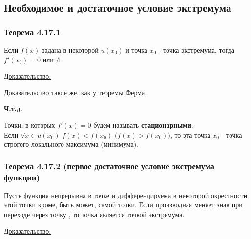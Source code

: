 \documentclass[12pt]{article}
\begin{document}
    \subsection{Необходимое и достаточное условие экстремума}
    \subsubsection*{Теорема 4.17.1}\label{th:4.17.1}
    Если $f(x)$ задана в некоторой $u(x_0)$ и точка $x_0$ - точка экстремума, тогда $f'(x_0) = 0$ или $\nexists$\par\noindent
    \underline{Доказательство:}
    \begin{adjustwidth}{1.5em}{1.5em}
        Доказательство такое же, как у \hyperref[th:4.12.1]{теоремы Ферма}.
        \begin{center}
            \textbf{Ч.т.д.}
        \end{center}
    \end{adjustwidth}
    Точки, в которых $f'(x) = 0$ будем называть \textbf{стационарными}.\\
    Если $\forall x \in u(x_0)$ $f(x) < f(x_0)$ ($f(x) > f(x_0)$), то эта точка $x_0$ - точка строгого локального максимума (минимума).
    \subsubsection*{Теорема 4.17.2 (первое достаточное условие экстремума функции)}\label{th:4.17.2}
    Пусть функция непрерывна в точке и дифференцируема в некоторой окрестности этой точки кроме, быть может, самой точки. Если производная меняет знак при переходе через точку , то точка является точкой экстремума.
    \par\noindent
    \underline{Доказательство:}
    \begin{adjustwidth}{1.5em}{1.5em}
    \end{adjustwidth}
\end{document}
